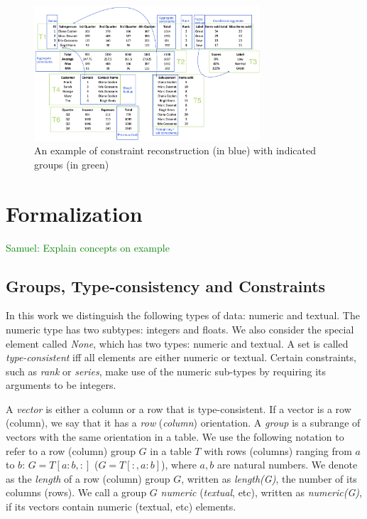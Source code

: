 \documentclass{ecai}
\newcommand{\samuel}[1]{\textcolor{green}{{\sc Samuel:} #1}\xspace}
\begin{document}
\begin{figure}[tbh]
  \begin{center}
    \includegraphics[width=0.75\textwidth]{figures/Demo.png}
  \end{center}
  \vspace{-10pt}
  \caption{An example of constraint reconstruction (in blue) with indicated groups (in green)}
  \label{fig:main_example}
\end{figure}

\section{Formalization}

\samuel{Explain concepts on example}
\subsection{Groups, Type-consistency and Constraints}
In this work we distinguish the following types of data: numeric and textual. The numeric type has two subtypes: integers and floats. We also consider the special element called \textit{None}, which has two types: numeric and textual. A set is called \textit{type-consistent} iff all elements are either numeric or textual. Certain constraints, such as \textit{rank} or \textit{series}, make use of the numeric sub-types by requiring its arguments to be integers.

A \textit{vector} is either a column or a row that is type-consistent. If a vector is a row (column), we say that it has a \textit{row} (\textit{column}) orientation. A \textit{group} is a subrange of vectors with the same orientation in a table. We use the following notation to refer to a row (column) group $G$ in a table $T$ with rows (columns) ranging from $a$ to $b$: $G = T[a{:}b,:]$ ($G = T[{:},a{:}b]$), where $a,b$ are natural numbers. We denote as the \textit{length} of a row (column) group $G$, written as \textit{length(G)}, the number of its columns (rows). We call a group $G$ \textit{numeric} (\textit{textual}, etc), written as \textit{numeric(G)}, if its vectors contain numeric (textual, etc) elements.
\end{document}
